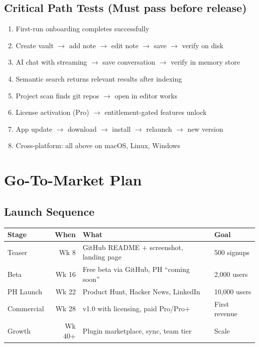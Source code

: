 \documentclass[11pt,a4paper]{article}
\begin{document}
\subsection{Critical Path Tests (Must pass before release)}

\begin{enumerate}[noitemsep]
  \item First-run onboarding completes successfully
  \item Create vault $\to$ add note $\to$ edit note $\to$ save $\to$ verify on disk
  \item AI chat with streaming $\to$ save conversation $\to$ verify in memory store
  \item Semantic search returns relevant results after indexing
  \item Project scan finds git repos $\to$ open in editor works
  \item License activation (Pro) $\to$ entitlement-gated features unlock
  \item App update $\to$ download $\to$ install $\to$ relaunch $\to$ new version
  \item Cross-platform: all above on macOS, Linux, Windows
\end{enumerate}

\section{Go-To-Market Plan}

\subsection{Launch Sequence}

\begin{table}[h]\centering\small
\begin{tabularx}{\textwidth}{XrXX}
\toprule
\textbf{Stage} & \textbf{When} & \textbf{What} & \textbf{Goal} \\
\midrule
Teaser & Wk 8 & GitHub README + screenshot, landing page & 500 signups \\
Beta & Wk 16 & Free beta via GitHub, PH ``coming soon'' & 2,000 users \\
PH Launch & Wk 22 & Product Hunt, Hacker News, LinkedIn & 10,000 users \\
Commercial & Wk 28 & v1.0 with licensing, paid Pro/Pro+ & First revenue \\
Growth & Wk 40+ & Plugin marketplace, sync, team tier & Scale \\
\bottomrule
\end{tabularx}
\end{table}
\end{document}
